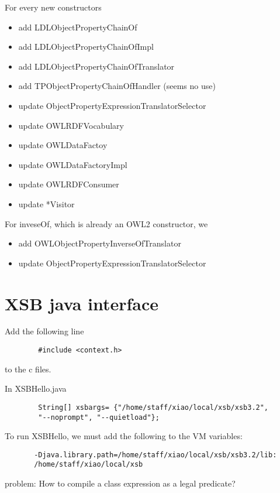 \documentclass{article}
\begin{document}
	For every new constructors
	
	\begin{itemize}
      \item add LDLObjectPropertyChainOf
      \item add LDLObjectPropertyChainOfImpl
      \item add LDLObjectPropertyChainOfTranslator 
      \item add TPObjectPropertyChainOfHandler (seems no use)
      \item update ObjectPropertyExpressionTranslatorSelector
      \item update OWLRDFVocabulary
      \item update OWLDataFactoy
      \item update OWLDataFactoryImpl
      \item update OWLRDFConsumer      
      \item update *Visitor
    \end{itemize}
	
	For inveseOf, which is already an OWL2 constructor, we 	
	\begin{itemize}
      \item add OWLObjectPropertyInverseOfTranslator
      \item update ObjectPropertyExpressionTranslatorSelector
    \end{itemize}
	
	
	\section{XSB java interface}
	
	
	Add the following line
	\begin{verbatim}
		#include <context.h>
	\end{verbatim}
	to the c files.
	
	In XSBHello.java
	\begin{verbatim}
    	String[] xsbargs= {"/home/staff/xiao/local/xsb/xsb3.2", 
    	"--noprompt", "--quietload"};
    \end{verbatim}
	
	To run XSBHello, we must add the following to the VM variables:
	\begin{verbatim}
       -Djava.library.path=/home/staff/xiao/local/xsb/xsb3.2/lib:
       /home/staff/xiao/local/xsb
    \end{verbatim}
	
	problem: How to compile a class expression as a legal predicate?
	
	
\end{document}
